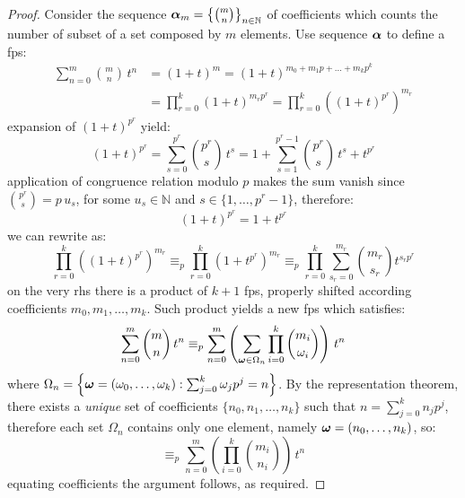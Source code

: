 \begin{proof}
    Consider the sequence $\boldsymbol{\alpha}_{m}=\left\lbrace{{m}\choose{n}}\right\rbrace_{n\in\mathbb{N}}$ 
    of coefficients which counts the number of subset
    of a set composed by $m$ elements. Use sequence $\boldsymbol{\alpha}$ to define a \ac{fps}:
    \begin{displaymath}
        \begin{split}
            \sum_{n=0}^{m}{{{m}\choose{n}}\,t^{n}} &= \left(1+t\right)^{m}
                = \left(1+t\right)^{m_{0}+m_{1}p+\ldots+m_{k}p^{k}}\\
                &= \prod_{r=0}^{k}{{\left(1+t\right)^{m_{r}p^{r}}}}
                = \prod_{r=0}^{k}{\left(\left(1+t\right)^{p^{r}}\right)^{m_{r}}}
        \end{split}
    \end{displaymath}
    expansion of $\left(1+t\right)^{p^{r}}$ yield: 
    \begin{displaymath}
            \left(1+t\right)^{p^{r}} = \sum_{s=0}^{p^{r}}{{{p^{r}}\choose{s}}\,t^{s}}
                = 1+\sum_{s=1}^{p^{r}-1}{{{p^{r}}\choose{s}}\,t^{s}}+t^{p^{r}}
    \end{displaymath}
    application of congruence relation modulo $p$ makes the sum vanish since ${{p^{r}}\choose{s}}=p\,u_{s}$,
    for some $u_{s}\in\mathbb{N}$ and $s\in\lbrace 1,\ldots,p^{r}-1\rbrace$, therefore:
    \begin{displaymath}
        \left(1+t\right)^{p^{r}} = 1+t^{p^{r}}
    \end{displaymath}
    we can rewrite as:
    \begin{displaymath}
        \prod_{r=0}^{k}{\left(\left(1+t\right)^{p^{r}}\right)^{m_{r}}}
            \equiv_{p} \prod_{r=0}^{k}{\left(1+t^{p^{r}}\right)^{m_{r}}}
            \equiv_{p} \prod_{r=0}^{k}{\sum_{s_{r}=0}^{m_{r}}{{{m_{r}}\choose{s_{r}}}t^{s_{r}p^{r}}}}
    \end{displaymath}
    on the very \ac{rhs} there is a product of $k+1$ \ac{fps}, properly shifted according coefficients
    $m_{0},m_{1},\ldots,m_{k}$. Such product yields a new \ac{fps} which satisfies:
    \begin{displaymath}
        \sum_{n=0}^{m}{{{m}\choose{n}}\,t^{n}} 
        \equiv_{p}
        \sum_{n=0}^{m}{\left(\sum_{\boldsymbol{\omega}\in\Omega_{n}}{\prod_{i=0}^{k}{{{m_{i}}\choose{\omega_{i}}}}}\right)\,t^{n}}
    \end{displaymath}
    where $\Omega_{n}=\left\lbrace\boldsymbol{\omega}=\left(\omega_{0},\ldots,\omega_{k}\right):
        \sum_{j=0}^{k}{\omega_{j}p^{j}}=n\right\rbrace$.
    By the representation theorem, there exists a \emph{unique} set of coefficients
    $\lbrace n_{0},n_{1},\ldots,n_{k}\rbrace$ such that $n=\sum_{j=0}^{k}{n_{j}p^{j}}$, therefore
    each set $\Omega_{n}$ contains only one element, namely $\boldsymbol{\omega}=(n_{0},\ldots,n_{k})$, so:
    \begin{displaymath}
        \equiv_{p} \sum_{n=0}^{m}{\left({\prod_{i=0}^{k}{{{m_{i}}\choose{n_{i}}}}}\right)\,t^{n}}
    \end{displaymath}
    equating coefficients the argument follows, as required.


\end{proof}
